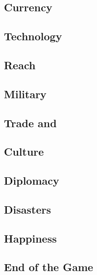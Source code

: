 \documentclass[12pt,a4paper,twocolumn,titlepage]{article}
\begin{document}
\subsection{Currency}
\label{sec:currency}


\subsection{Technology}
\label{sec:technology}


\subsection{Reach}
\label{sec:reach}


\subsection{Military}
\label{sec:military}

% 

\subsection{Trade and \convoys}
\label{sec:trade}


\subsection{Culture}
\label{sec:culture}


\subsection{Diplomacy}
\label{sec:diplomacy}


\subsection{Disasters}
\label{sec:disasters}


\subsection{Happiness}
\label{sec:happiness}


\subsection{End of the Game}
\label{sec:endgame}

\end{document}
